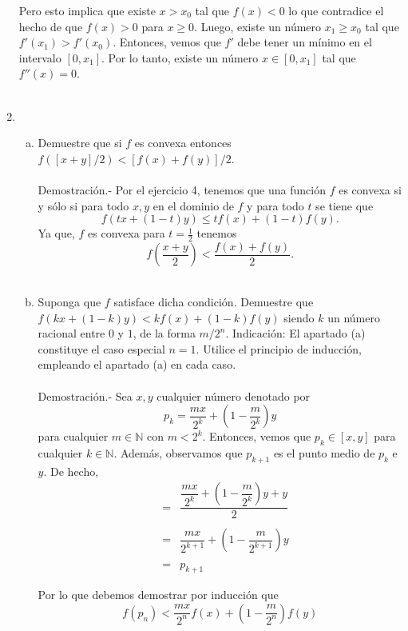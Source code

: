 \begin{enumerate}[\bfseries 1.]
	Pero esto implica que existe $x>x_0$ tal que $f(x)<0$ lo que contradice el hecho de que $f(x)>0$ para $x\geq 0$. Luego, existe un número $x_1\geq x_0$ tal que $f'(x_1)>f'(x_0)$. Entonces, vemos que $f'$ debe tener un mínimo en el intervalo $[0,x_1]$. Por lo tanto, existe un número $x\in [0,x_1]$ tal que $f''(x)=0$.\\\\


    \item 
	\begin{enumerate}[(a)]

	    \item Demuestre que si $f$ es convexa entonces $f([x + y]/2)<[f(x) + f(y )]/2$.\\\\
		Demostración.-\; Por el ejercicio 4, tenemos que una función $f$ es convexa si y sólo si para todo $x,y$ en el dominio de $f$ y para todo $t$ se tiene que 
		$$f(tx+(1-t)y)\leq tf(x)+(1-t)f(y).$$
		Ya que, $f$ es convexa para $t=\frac{1}{2}$ tenemos
		$$f\left(\dfrac{x+y}{2}\right)<\dfrac{f(x)+f(y)}{2}.$$\\

	    \item Suponga que $f$ satisface dicha condición. Demuestre que $f(kx + (1-k)y)<kf(x) + (1-k)f(y)$ siendo $k$ un número racional entre $0$ y $1$, de la forma $m/2^n$. Indicación: El apartado (a) constituye el caso especial $n = 1$. Utilice el principio de inducción, empleando el apartado (a) en cada caso.\\\\
		Demostración.-\; Sea $x,y$ cualquier número denotado por
		$$p_k=\dfrac{mx}{2^k}+\left(1-\dfrac{m}{2^k}\right)y$$
		para cualquier $m\in \mathbb{N}$ con $m<2^k$. Entonces, vemos que $p_k\in \left[x,y\right]$ para cualquier $k\in \mathbb{N}$. Además, observamos que $p_{k+1}$ es el punto medio de $p_k$ e $y$. De hecho,
		$$
		\begin{array}{rcl}
		    \dfrac{}{} &=& \dfrac{\dfrac{mx}{2^k}+\left(1-\dfrac{m}{2^k}\right)y+y}{2}\\\\
			       &=& \dfrac{mx}{2^{k+1}}+\left(1-\dfrac{m}{2^{k+1}}\right)y\\\\
			       &=& p_ {k+1}
		\end{array}
		$$
		
		Por lo que debemos demostrar por inducción que 
		$$f\left(p_n\right)<\dfrac{mx}{2^n}f(x)+\left(1-\dfrac{m}{2^n}\right)f(y)$$


\end{enumerate}
\end{enumerate}

